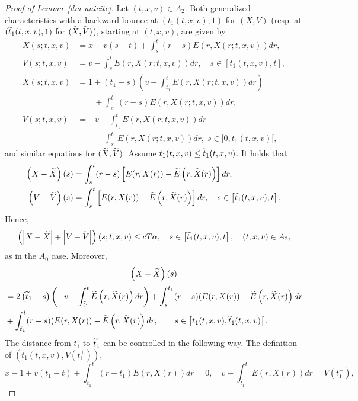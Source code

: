 \documentclass[AHL,Unicode,longabstracts,published]{cedram}
\let\oldtilde\tilde
\renewcommand*{\tilde}[1]{\mathchoice{\widetilde{#1}}{\widetilde{#1}}{\oldtilde{#1}}{\oldtilde{#1}}}
\begin{document}
\begin{proof}[{Proof of Lemma~\ref{dm-unicite}}]
Let $(t,x,v)\in A_2$. Both generalized characteristics with a backward bounce at $(t_1(t,x,v),1)$ for $(X,V)$ (resp. at $(\tilde{t}_1(t,x,v),1)$ for $(\tilde{X},\tilde{V})$), starting at $(t,x,v)$, are given by
\begin{align*}
X(s;t,x,v)&= x+v(s-t)+\int_s^t (r-s)E\left(r,X(r;t,x,v)\right)dr, \\
V(s;t,x,v)&= v-\int_s^t E(r,X(r;t,x,v))dr, \quad s \in [t_1(t,x,v),t], \\
X(s;t,x,v)&= 1+(t_1-s) \left (v-\int_{t_1}^t E(r,X(r;t,x,v))dr \right) \\
&\qquad + \int_s^{t_1} (r-s)E(r,X(r;t,x,v))dr, \\
V(s;t,x,v) &= -v+\int_{t_1}^t E(r,X(r;t,x,v))dr 
\\
&\qquad- \int_s^{t_1} E(r,X(r;t,x,v))dr, \; s \in [0,t_1(t,x,v)[,
\end{align*}
and similar equations for $(\tilde{X},\tilde{V})$. Assume $t_1(t,x,v)\leq
\tilde{t}_1(t,x,v)$. It holds that
\begin{align*}
\left(X-\tilde{X}\right)(s) &= \int_s^t (r-s) \left [E(r,X(r))-\tilde{E}\left(r,\tilde{X}(r)\right) \right] dr, \\
\left(V-\tilde{V}\right)(s) &= \int_s^t \left[E(r,X(r))-\tilde{E}\left(r,\tilde{X}(r)\right) \right] dr, \quad s \in \left[\tilde{t}_1(t,x,v),t\right].
\end{align*}
Hence,
\begin{equation}\label{A2-a}
\left (\left|X-\tilde{X}\right|+\left|V-\tilde{V}\right| \right) (s;t,x,v) \leq cT\alpha, \quad s \in \left[\tilde{t}_1(t,x,v),t\right], \quad (t,x,v)\in A_2,
\end{equation}
as in the $A_0$ case. Moreover,
\begin{multline}\label{A2-b}
\left(X-\tilde{X}\right)(s)\\
\begin{aligned}
&= 2\left(\tilde{t}_1-s\right) \left(-v + \int _{\tilde{t}_1}^t \tilde{E}\left(r,\tilde{X}(r)\right)dr \right) + \int_s^{\tilde{t}_1} (r-s) (E(r,X(r))-\tilde{E}\left(r,\tilde{X}(r)\right) dr \\
&+ \int_{\tilde{t}_1}^t (r-s) (E(r,X(r))-\tilde{E}\left(r,\tilde{X}(r)\right)dr, \qquad s \in \left[t_1(t,x,v), \tilde{t}_1(t,x,v)\right[.
\end{aligned}
\end{multline}
The distance from $t_1$ to $\tilde{t}_1$ can be controlled in the following way. The definition of $(t_1(t,x,v), V(t_1^+))$,
\[
x-1+v(t_1-t)+\int_{t_1}^t (r-t_1)E(r,X(r))dr = 0, \quad v-\int_{t_1}^t E(r,X(r))dr = V(t_1^+),
\]
\end{proof}
\end{document}
